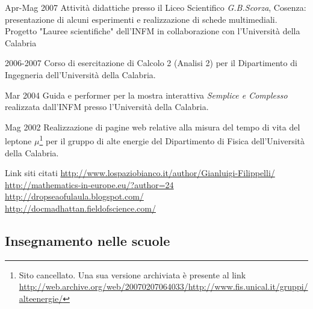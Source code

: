 \begin{CV}
	\item[Apr-Mag 2007] Attivit\`a didattiche presso il Liceo Scientifico {\em G.B.Scorza}, Cosenza: presentazione di alcuni esperimenti e realizzazione di schede multimediali. Progetto "Lauree scientifiche" dell'INFM in collaborazione con l'Universit\`a della Calabria
	
	\item[2006-2007] Corso di esercitazione di Calcolo 2 (Analisi 2) per il Dipartimento di Ingegneria dell'Universit\`a della Calabria.
	
	\item[Mar 2004] Guida e performer per la mostra interattiva {\em Semplice e Complesso} realizzata dall'INFM presso l'Universit\`a della Calabria.
	
	\item[Mag 2002] Realizzazione di pagine web relative alla misura del tempo di vita del leptone $\mu$\footnote{Sito cancellato. Una sua versione archiviata \`e presente al link \href{http://web.archive.org/web/20070207064033/http://www.fis.unical.it/gruppi/alteenergie/}{http://web.archive.org/web/20070207064033/http://www.fis.unical.it/gruppi/alteenergie/}} per il gruppo di alte energie del Dipartimento di Fisica dell'Universit\`a della Calabria.
	
	\item[Link siti citati] \href{http://www.lospaziobianco.it/author/Gianluigi-Filippelli/}{http://www.lospaziobianco.it/author/Gianluigi-Filippelli/}\\
	\href{http://mathematics-in-europe.eu/?author=24}{http://mathematics-in-europe.eu/?author=24}\\
	\href{http://dropseaofulaula.blogspot.com/}{http://dropseaofulaula.blogspot.com/}\\
	\href{http://docmadhattan.fieldofscience.com/}{http://docmadhattan.fieldofscience.com/}
	
\end{CV}

\subsection*{Insegnamento nelle scuole}

